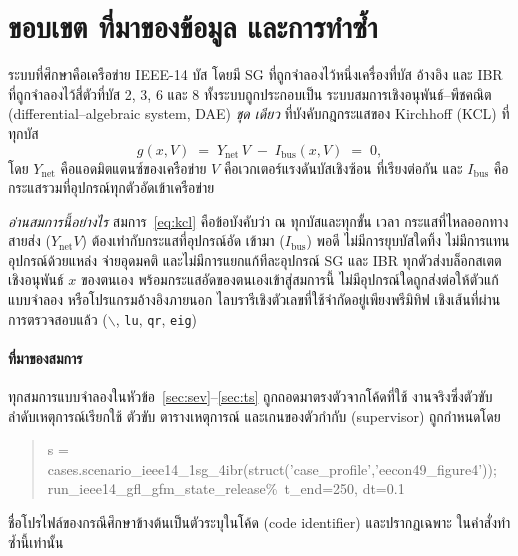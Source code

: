 \documentclass[12pt,a4paper]{article}
\begin{document}
\tableofcontents
\newpage

\section{ขอบเขต ที่มาของข้อมูล และการทำซ้ำ}\label{sec:scope}
ระบบที่ศึกษาคือเครือข่าย IEEE-14 บัส โดยมี SG ที่ถูกจำลองไว้หนึ่งเครื่องที่บัส
อ้างอิง และ IBR ที่ถูกจำลองไว้สี่ตัวที่บัส 2, 3, 6 และ 8 ทั้งระบบถูกประกอบเป็น
ระบบสมการเชิงอนุพันธ์--พีชคณิต (differential--algebraic system, DAE) \emph{ชุด
เดียว} ที่บังคับกฎกระแสของ Kirchhoff (KCL) ที่ทุกบัส
\begin{equation}
  g(x,V)\;=\;Y_{\mathrm{net}}\,V \;-\; I_{\mathrm{bus}}(x,V)\;=\;0,
  \label{eq:kcl}
\end{equation}
โดย $Y_{\mathrm{net}}$ คือแอดมิตแตนซ์ของเครือข่าย $V$ คือเวกเตอร์แรงดันบัสเชิงซ้อน
ที่เรียงต่อกัน และ $I_{\mathrm{bus}}$ คือกระแสรวมที่อุปกรณ์ทุกตัวอัดเข้าเครือข่าย

\emph{อ่านสมการนี้อย่างไร} สมการ~\eqref{eq:kcl} คือข้อบังคับว่า ณ ทุกบัสและทุกขั้น
เวลา กระแสที่ไหลออกทางสายส่ง ($Y_{\mathrm{net}}V$) ต้องเท่ากับกระแสที่อุปกรณ์อัด
เข้ามา ($I_{\mathrm{bus}}$) พอดี ไม่มีการยุบบัสใดทิ้ง ไม่มีการแทนอุปกรณ์ด้วยแหล่ง
จ่ายอุดมคติ และไม่มีการแยกแก้ทีละอุปกรณ์ SG และ IBR ทุกตัวส่งบล็อกสเตตเชิงอนุพันธ์
$x$ ของตนเอง พร้อมกระแสอัดของตนเองเข้าสู่สมการนี้ ไม่มีอุปกรณ์ใดถูกส่งต่อให้ตัวแก้
แบบจำลอง หรือโปรแกรมอ้างอิงภายนอก ไลบรารีเชิงตัวเลขที่ใช้จำกัดอยู่เพียงพรีมิทิฟ
เชิงเส้นที่ผ่านการตรวจสอบแล้ว ($\backslash$, \texttt{lu}, \texttt{qr},
\texttt{eig})

\paragraph{ที่มาของสมการ}
ทุกสมการแบบจำลองในหัวข้อ~\ref{sec:sev}--\ref{sec:ts} ถูกถอดมาตรงตัวจากโค้ดที่ใช้
งานจริงซึ่งตัวขับลำดับเหตุการณ์เรียกใช้ ตัวขับ ตารางเหตุการณ์ และเกนของตัวกำกับ
(supervisor) ถูกกำหนดโดย
\begin{quote}\footnotesize\ttfamily\raggedright
s = cases.scenario\_ieee14\_1sg\_4ibr(\allowbreak struct('case\_profile',\allowbreak 'eecon49\_figure4'));\\
run\_ieee14\_gfl\_gfm\_state\_release\quad \%\ t\_end=250, dt=0.1
\end{quote}
ชื่อโปรไฟล์ของกรณีศึกษาข้างต้นเป็นตัวระบุในโค้ด (code identifier) และปรากฏเฉพาะ
ในคำสั่งทำซ้ำนี้เท่านั้น
\end{document}
